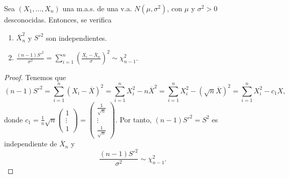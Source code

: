\begin{theorem}
Sea $\displaystyle \left(X_{1}, \ldots, X_{n}\right) $ una m.a.s. de una v.a. $\displaystyle N\left(\mu, \sigma^{2}\right) $, con $\displaystyle \mu $ y $\displaystyle \sigma^{2}>0 $ desconocidas. Entonces, se verifica
\begin{enumerate}
\item $\displaystyle \overline{X}^{2}_{n} $ y $\displaystyle S'^{2} $ son independientes.
\item $\displaystyle \frac{\left(n-1\right)S'^{2}}{\sigma^{2}}=\sum^{n}_{i = 1}\left(\frac{X_{i}-\overline{X}_{n}}{\sigma }\right)^{2}\sim \chi^{2}_{n-1} $. 
\end{enumerate}
\end{theorem}
\begin{proof}
Tenemos que 
\[\left(n-1\right)S'^{2}=\sum^{n}_{i = 1}\left(X_{i}-\overline{X}\right)^{2}=\sum^{n}_{i = 1}X_{i}^{2}-n\overline{X}^{2}=\sum^{n}_{i = 1}X_{i}^{2}-\left(\sqrt{n}\overline{X}\right)^{2}=\sum^{n}_{i = 1}X_{i}^{2}-c_{1}X ,\]
donde $\displaystyle c_{1}=\frac{1}{n}\sqrt{n}\begin{pmatrix} 1 \\ \vdots \\ 1 \end{pmatrix}=\begin{pmatrix} \frac{1}{\sqrt{n}} \\ \vdots \\ \frac{1}{\sqrt{n}} \end{pmatrix} $. Por tanto, $\displaystyle \left(n-1\right)S'^{2}=S^{2} $ es independiente de $\displaystyle \overline{X}_{n} $ y 
\[\frac{\left(n-1\right)S'^{2}}{\sigma^{2}} \sim \chi^{2}_{n-1}.\]
\end{proof}
